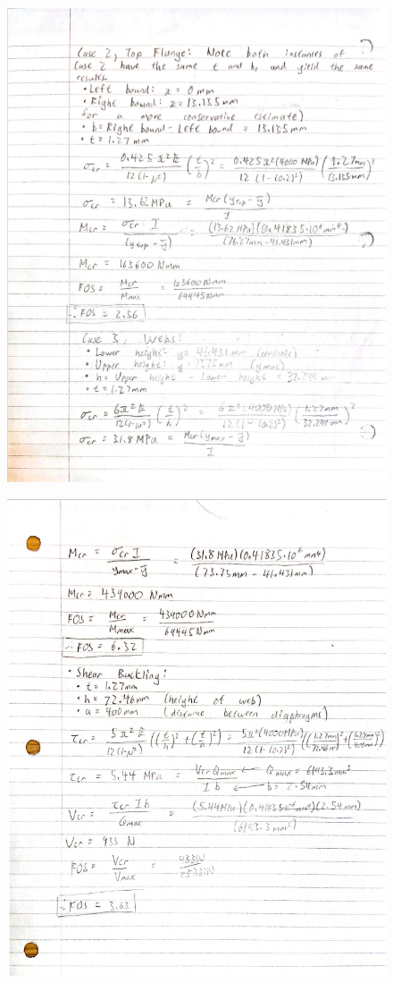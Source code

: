 \documentclass[11pt]{article}
\begin{document}
\begin{figure}[H]
    \centering
    \includegraphics[width=0.95\linewidth]{images/D0 Hand Calcs P4.png}
\end{figure}

\begin{figure}[H]
    \centering
    \includegraphics[width=0.95\linewidth]{images/D0 Hand Calcs P5.png}
\end{figure}
\end{document}

